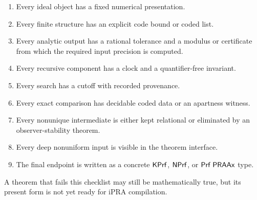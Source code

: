 \begin{enumerate}
\item Every ideal object has a fixed numerical presentation.
\item Every finite structure has an explicit code bound or coded list.
\item Every analytic output has a rational tolerance and a modulus or
certificate from which the required input precision is computed.
\item Every recursive component has a clock and a quantifier-free invariant.
\item Every search has a cutoff with recorded provenance.
\item Every exact comparison has decidable coded data or an apartness witness.
\item Every nonunique intermediate is either kept relational or eliminated by
an observer-stability theorem.
\item Every deep nonuniform input is visible in the theorem interface.
\item The final endpoint is written as a concrete \(\mathsf{KPrf}\), \(\mathsf{NPrf}\), or
\(\mathsf{Prf}\;\mathsf{PRAAx}\) type.
\end{enumerate}

A theorem that fails this checklist may still be mathematically true, but its
present form is not yet ready for iPRA compilation.
